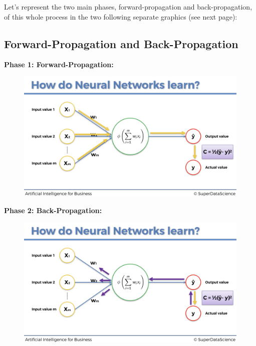 \documentclass[]{book}
\begin{document}
Let's represent the two main phases, forward-propagation and back-propagation, of this whole process in the two following separate graphics (see next page):

\newpage

\subsection{Forward-Propagation and Back-Propagation}

\textbf{Phase 1: Forward-Propagation:}

\begin{figure}[!htbp]
        \begin{center}
            \includegraphics[scale=0.18]{ANN_18.png}
        \end{center}
\end{figure}

\textbf{Phase 2: Back-Propagation:}

\begin{figure}[!htbp]
        \begin{center}
            \includegraphics[scale=0.18]{ANN_19.png}
        \end{center}
\end{figure}
\end{document}
